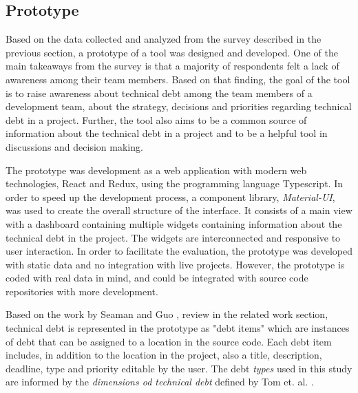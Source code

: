 \subsection{Prototype}
Based on the data collected and analyzed from the survey described in the previous section, a prototype of a tool was designed and developed.
One of the main takeaways from the survey is that a majority of respondents felt a lack of awareness among their team members.
Based on that finding, the goal of the tool is to raise awareness about technical debt among the team members of a development team, about the strategy, decisions and priorities regarding technical debt in a project.
Further, the tool also aims to be a common source of information about the technical debt in a project and to be a helpful tool in discussions and decision making.

The prototype was development as a web application with modern web technologies, React and Redux, using the programming language Typescript.
In order to speed up the development process, a component library, \textit{Material-UI}, was used to create the overall structure of the interface.
It consists of a main view with a dashboard containing multiple widgets containing information about the technical debt in the project.
The widgets are interconnected and responsive to user interaction.
In order to facilitate the evaluation, the prototype was developed with static data and no integration with live projects.
However, the prototype is coded with real data in mind, and could be integrated with source code repositories with more development.

Based on the work by Seaman and Guo \cite{seaman_measuring_2011}, review in the related work section, technical debt is represented in the prototype as "debt items" which are instances of debt that can be assigned to a location in the source code.
Each debt item includes, in addition to the location in the project, also a title, description, deadline, type and priority editable by the user.
The debt \textit{types} used in this study are informed by the \textit{dimensions od technical debt} defined by Tom et. al. \cite{tom_exploration_2013}.



